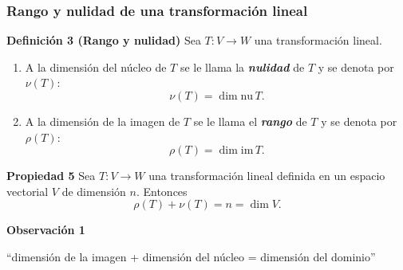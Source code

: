 {\nologo
\begin{frame}\frametitle{Rango y nulidad de una transformación lineal}

\vspace{-2mm}

\begin{defi}{\textbf{Definición 3 (Rango y nulidad)}}\justifying
	Sea $T:V\to W$ una transformación lineal.
	\begin{enumerate}
		\item[\labelname{$a$}] A la dimensión del núcleo de $T$ se le llama la \textbf{\textit{nulidad}} de $T$ y se denota por $\nu(T)$:
		\[
		\nu(T) = \dim \text{nu}\, T.
		\]
		\item[\labelname{$b$}] A la dimensión de la imagen de $T$ se le llama el \textbf{\textit{rango}} de $T$ y se denota por $\rho(T)$:
		\[
		\rho(T) = \dim \text{im}\, T.
		\]
	\end{enumerate}
\end{defi}	

\vspace{-1mm}

\begin{prop}{\textbf{Propiedad 5}}
	\justifying
	Sea $T:V\to W$ una transformación lineal definida en un espacio vectorial $V$ de dimensión $n$. Entonces
	\[
		\rho(T) + \nu(T) = n = \dim V.
	\]
\end{prop}	

\vspace{-1mm}

\begin{alertblock}{\textbf{Observación 1}}

\begin{center}
	``dimensión de la imagen + dimensión del núcleo = dimensión del dominio''
\end{center}
\end{alertblock}

\end{frame}
}


\subsection{}


